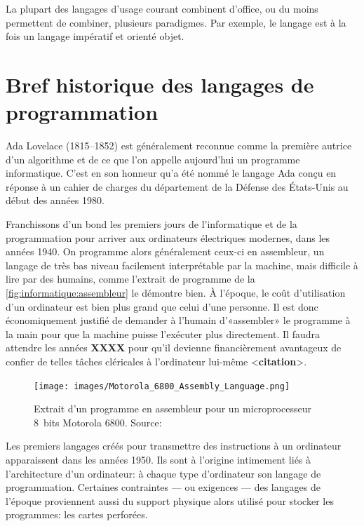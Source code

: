 La plupart des langages d'usage courant combinent d'office, ou du
moins permettent de combiner, plusieurs paradigmes. Par exemple, le
langage {\Cpp} est à la fois un langage impératif et orienté objet.


\section{Bref historique des langages de programmation}
\label{sec:informatique:historique}

Ada Lovelace (1815--1852) est généralement reconnue comme la première
autrice d'un algorithme et de ce que l'on appelle aujourd'hui un
programme informatique. C'est en son honneur qu'a été nommé le langage
Ada conçu en réponse à un cahier de charges du département de la
Défense des États-Unis au début des années 1980.

Franchissons d'un bond les premiers jours de l'informatique et de la
programmation pour arriver aux ordinateurs électriques modernes, dans
les années 1940. On programme alors généralement ceux-ci en
assembleur, un langage de très bas niveau facilement
interprétable par la machine, mais difficile à lire par des humains,
comme l'extrait de programme de la
\autoref{fig:informatique:assembleur} le démontre bien. À l'époque, le
coût d'utilisation d'un ordinateur est bien plus grand que celui d'une
personne. Il est donc économiquement justifié de demander à l'humain
d'«assembler» le programme à la main pour que la machine puisse
l'exécuter plus directement. Il faudra attendre les années
\textbf{XXXX} pour qu'il devienne financièrement avantageux de confier
de telles tâches cléricales à l'ordinateur lui-même <\textbf{citation}>.

\begin{figure}
  \centering
  \texttt{[image: images/Motorola\_6800\_Assembly\_Language.png]}
  \caption[Programme en assembleur pour un microprocesseur 8~bits
  Motorola 6800.]{Extrait d'un programme en assembleur pour un
    microprocesseur 8~bits Motorola 6800. {\small Source:
      }}
  \label{fig:informatique:assembleur}
\end{figure}

Les premiers langages créés pour transmettre des instructions à un
ordinateur apparaissent dans les années 1950. Ils sont à l'origine
intimement liés à l'architecture d'un ordinateur: à chaque type
d'ordinateur son langage de programmation. Certaines contraintes ---
ou exigences --- des langages de l'époque proviennent aussi du support
physique alors utilisé pour stocker les programmes: les cartes
perforées.

